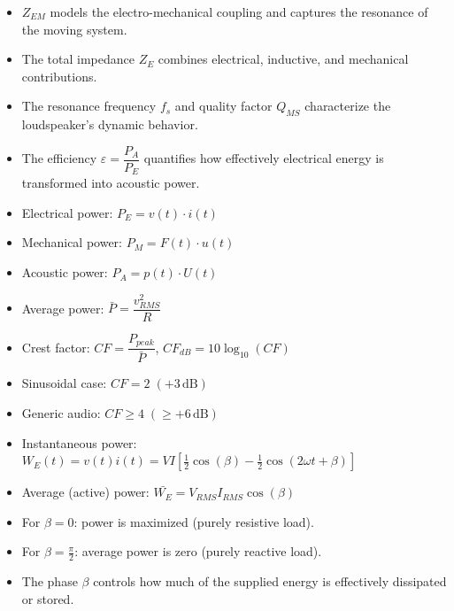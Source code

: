 \begin{tcolorbox}[colback=gray!5,colframe=gray!50!black,title=Key Points]
\begin{itemize}
    \item \( Z_{EM} \) models the electro-mechanical coupling and captures the resonance of the moving system.
    \item The total impedance \( Z_E \) combines electrical, inductive, and mechanical contributions.
    \item The resonance frequency \( f_s \) and quality factor \( Q_{MS} \) characterize the loudspeaker’s dynamic behavior.
    \item The efficiency \( \varepsilon = \dfrac{P_A}{P_E} \) quantifies how effectively electrical energy is transformed into acoustic power.
\end{itemize}
\end{tcolorbox}


\begin{tcolorbox}[colback=gray!5,colframe=gray!50!black,title=Key Points]
\begin{itemize}
    \item Electrical power: \( P_E = v(t) \cdot i(t) \)
    \item Mechanical power: \( P_M = F(t) \cdot u(t) \)
    \item Acoustic power: \( P_A = p(t) \cdot U(t) \)
    \item Average power: \( \bar{P} = \dfrac{v_{RMS}^2}{R} \)
    \item Crest factor: \( CF = \dfrac{P_{peak}}{\bar{P}} \), \( CF_{dB} = 10 \log_{10}(CF) \)
    \item Sinusoidal case: \( CF = 2 \; (+3\,\mathrm{dB}) \)
    \item Generic audio: \( CF \geq 4 \; (\geq +6\,\mathrm{dB}) \)
\end{itemize}
\end{tcolorbox}

\begin{tcolorbox}[colback=gray!5,colframe=gray!50!black,title=Key Points]
\begin{itemize}
    \item Instantaneous power: \( W_E(t) = v(t) i(t) = V I [\tfrac{1}{2}\cos(\beta) - \tfrac{1}{2}\cos(2 \omega t + \beta)] \)
    \item Average (active) power: \( \bar{W_E} = V_{RMS} I_{RMS} \cos(\beta) \)
    \item For \( \beta = 0 \): power is maximized (purely resistive load).
    \item For \( \beta = \frac{\pi}{2} \): average power is zero (purely reactive load).
    \item The phase \( \beta \) controls how much of the supplied energy is effectively dissipated or stored.
\end{itemize}
\end{tcolorbox}



